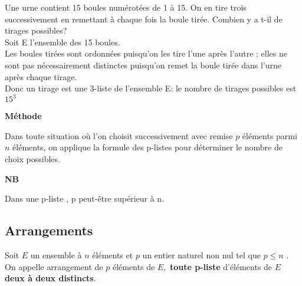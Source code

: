  \begin{example}

Une urne contient 15 boules numérotées de 1 à 15. On en tire trois successivement en remettant à chaque fois la boule tirée.  Combien y a t-il de tirages  possibles? \\

Soit E l'ensemble des 15 boules.\\
Les boules tirées sont ordonnées puisqu'on les tire l'une après l'autre ; elles ne sont pas nécessairement distinctes puisqu'on remet la boule tirée dans l'urne  après chaque tirage.\\
Donc un tirage est une  3-liste  de l'ensemble E: le nombre de tirages possibles est $ 15^{3} $
 \end{example}

\bigskip


\textbf{Méthode}

Dans toute situation où  l'on choisit successivement avec remise $ p $ éléments parmi $ n $ éléments, on applique la formule des  p-listes   pour déterminer le nombre de choix possibles.


\medskip
\textbf{NB}

Dans une p-liste , p peut-être supérieur à n.




 
\subsection{Arrangements}
\begin{definition}
Soit $ E $ un ensemble à $ n $ éléments et $ p $ un entier naturel non nul tel que $p\leq n  $ .\\
On appelle  arrangement  de $ p  $ éléments  de $ E,$   \textbf{toute  p-liste}  d'éléments de $ E $ \textbf{deux à deux distincts}.
\end{definition}


